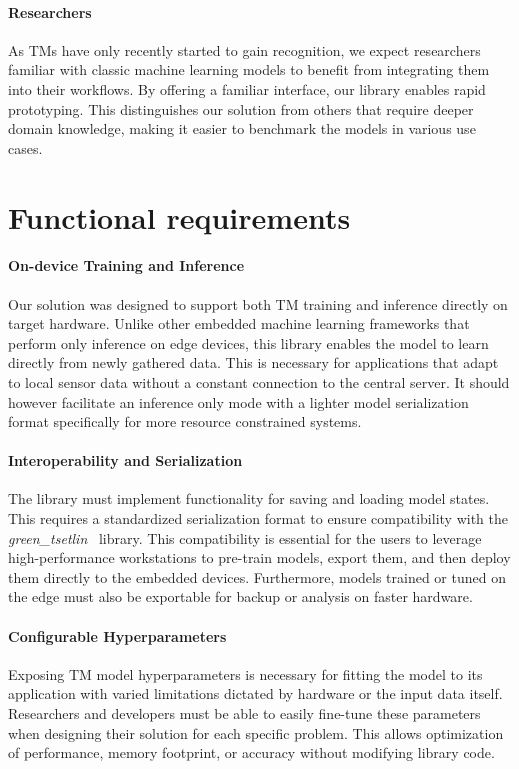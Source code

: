 \documentclass[english]{aghengthesis} %
\newcommand*{\GreenTsetlinName}{\emph{green\_tsetlin}~\cite{glimsdal2024greentsetlin} }
\begin{document}
\paragraph{Researchers}
As TMs have only recently started to gain recognition, we expect researchers familiar with classic machine learning models to benefit from integrating them into their workflows. By offering a familiar interface, our library enables rapid prototyping. This distinguishes our solution from others that require deeper domain knowledge, making it easier to benchmark the models in various use cases.

\clearpage
\section{Functional requirements}

\paragraph{On-device Training and Inference}
Our solution was designed to support both TM training and inference directly on target hardware. Unlike other embedded machine learning frameworks that perform only inference on edge devices, this library enables the model to learn directly from newly gathered data. This is necessary for applications that adapt to local sensor data without a constant connection to the central server.
It should however facilitate an inference only mode with a lighter model serialization format specifically for more resource constrained systems.

\paragraph{Interoperability and Serialization}
The library must implement functionality for saving and loading model states. This requires a standardized serialization format to ensure compatibility with the \GreenTsetlinName library. This compatibility is essential for the users to leverage high-performance workstations to pre-train models, export them, and then deploy them directly to the embedded devices. Furthermore, models trained or tuned on the edge must also be exportable for backup or analysis on faster hardware.

\paragraph{Configurable Hyperparameters}
Exposing TM model hyperparameters is necessary for fitting the model to its application with varied limitations dictated by hardware or the input data itself. Researchers and developers must be able to easily fine-tune these parameters when designing their solution for each specific problem. This allows optimization of performance, memory footprint, or accuracy without modifying library code. 
\end{document}
